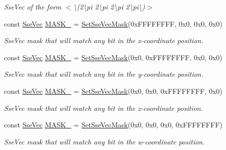 \begin{DoxyCompactItemize}
\begin{DoxyCompactList}\small\item\em Sse\+Vec of the form $<$\textbackslash{}(2\textbackslash{}pi 2\textbackslash{}pi 2\textbackslash{}pi 2\textbackslash{}pi\textbackslash{})$>$ \end{DoxyCompactList}\item 
const \hyperlink{namespacegfxmath_a0de2243e2b8d0fd46d3af5e036423004}{Sse\+Vec} \hyperlink{namespacegfxmath_a10283405fa4ee9c652e68cd952034937}{M\+A\+S\+K\+\_} = \hyperlink{namespacegfxmath_ae6fdce7b817a9d0caea6a71c5a377bbb}{Set\+Sse\+Vec\+Mask}(0x\+F\+F\+F\+F\+F\+F\+F\+F, 0x0, 0x0, 0x0)
\begin{DoxyCompactList}\small\item\em Sse\+Vec mask that will match any bit in the x-\/coordinate position. \end{DoxyCompactList}\item 
const \hyperlink{namespacegfxmath_a0de2243e2b8d0fd46d3af5e036423004}{Sse\+Vec} \hyperlink{namespacegfxmath_a2e6aab98443e9d5e2fe4270a1ed690ea}{M\+A\+S\+K\+\_} = \hyperlink{namespacegfxmath_ae6fdce7b817a9d0caea6a71c5a377bbb}{Set\+Sse\+Vec\+Mask}(0x0, 0x\+F\+F\+F\+F\+F\+F\+F\+F, 0x0, 0x0)
\begin{DoxyCompactList}\small\item\em Sse\+Vec mask that will match any bit in the y-\/coordinate position. \end{DoxyCompactList}\item 
const \hyperlink{namespacegfxmath_a0de2243e2b8d0fd46d3af5e036423004}{Sse\+Vec} \hyperlink{namespacegfxmath_a8cb1abe895cbdf8c2bfd4aebad8d8593}{M\+A\+S\+K\+\_} = \hyperlink{namespacegfxmath_ae6fdce7b817a9d0caea6a71c5a377bbb}{Set\+Sse\+Vec\+Mask}(0x0, 0x0, 0x\+F\+F\+F\+F\+F\+F\+F\+F, 0x0)
\begin{DoxyCompactList}\small\item\em Sse\+Vec mask that will match any bit in the z-\/coordinate position. \end{DoxyCompactList}\item 
const \hyperlink{namespacegfxmath_a0de2243e2b8d0fd46d3af5e036423004}{Sse\+Vec} \hyperlink{namespacegfxmath_a509609b50e3dc6f09c54ef9d02f48f2c}{M\+A\+S\+K\+\_} = \hyperlink{namespacegfxmath_ae6fdce7b817a9d0caea6a71c5a377bbb}{Set\+Sse\+Vec\+Mask}(0x0, 0x0, 0x0, 0x\+F\+F\+F\+F\+F\+F\+F\+F)
\begin{DoxyCompactList}\small\item\em Sse\+Vec mask that will match any bit in the w-\/coordinate position. \end{DoxyCompactList}\item 

\end{DoxyCompactItemize}
